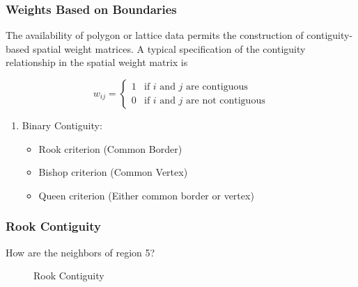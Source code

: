 \documentclass[english,10pt]{beamer}\usepackage[]{graphicx}\usepackage[]{xcolor}
\begin{document}
\begin{frame}
  \frametitle{Weights Based on Boundaries}
  The availability of polygon or lattice data permits the construction of contiguity-based spatial weight matrices. A typical specification of the contiguity relationship in the spatial weight matrix is

\begin{equation}
  w_{ij}= 
   \begin{cases}
      1 & \mbox{if $i$ and $j$ are contiguous} \\ 
      0 & \mbox{if $i$ and $j$ are not contiguous} 
   \end{cases}
\end{equation}

  \begin{enumerate}
    \item Binary Contiguity:
      \begin{itemize}
        \item Rook criterion (Common Border)
        \item Bishop criterion (Common Vertex)
        \item Queen criterion (Either common border or vertex)
      \end{itemize}
  \end{enumerate}
\end{frame}


\begin{frame}
  \frametitle{Rook Contiguity}
  
  How are the neighbors of region 5?
  
\begin{figure}[h]
\caption{Rook Contiguity}
\label{fig:Rook_cont_grid}
\centering
{}
\end{figure}
\end{frame}
		
\end{document}

